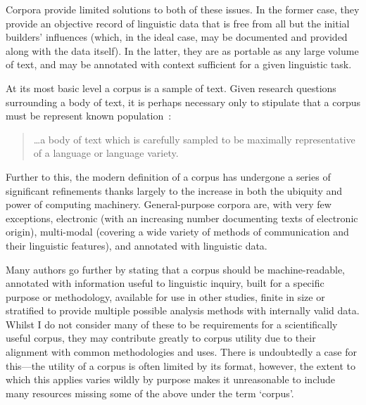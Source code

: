 Corpora provide limited solutions to both of these issues.  In the former case, they provide an objective record of linguistic data that is free from all but the initial builders' influences (which, in the ideal case, may be documented and provided along with the data itself).  In the latter, they are as portable as any large volume of text, and may be annotated with context sufficient for a given linguistic task.


At its most basic level a corpus is a sample of text.  Given research questions surrounding a body of text, it is perhaps necessary only to stipulate that a corpus must be represent known population~\cite[p. 22]{mcenery2001corpus}:

\begin{quote}
\ldots{}a body of text which is carefully sampled to be maximally representative of a language or language variety.
\end{quote}

Further to this, the modern definition of a corpus has undergone a series of significant refinements thanks largely to the increase in both the ubiquity and power of computing machinery.  General-purpose corpora are, with very few exceptions, electronic (with an increasing number documenting texts of electronic origin), multi-modal (covering a wide variety of methods of communication and their linguistic features), and annotated with linguistic data.

Many authors go further by stating that a corpus should be machine-readable, annotated with information useful to linguistic inquiry, built for a specific purpose or methodology, available for use in other studies, finite in size or stratified to provide multiple possible analysis methods with internally valid data\cite{bennett2010using,bowker2002working,leech1992corpora}.
Whilst I do not consider many of these to be requirements for a scientifically useful corpus, they may contribute greatly to corpus utility due to their alignment with common methodologies and uses.  There is undoubtedly a case for this---the utility of a corpus is often limited by its format, however, the extent to which this applies varies wildly by purpose makes it unreasonable to include many resources missing some of the above under the term `corpus'.


